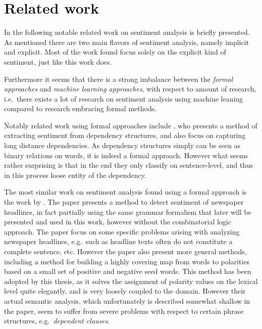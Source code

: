 \section{Related work}
\label{sec:relatedWork}
In the following notable related work on sentiment analysis is briefly presented. As mentioned there are two main flavors of sentiment analysis, namely implicit and explicit. Most of the work found focus solely on the explicit kind of sentiment, just like this work does. 

Furthermore it seems that there is a strong imbalance between the \emph{formal approaches} and \emph{machine learning approaches}, with respect to amount of research, i.e.\ there exists a lot of research on sentiment analysis using machine leaning compared to research embracing formal methods. 


Notably related work using formal approaches include \citeauthor{dependencySentiment} , who presents a method of extracting sentiment from dependency structures, and also focus on capturing long distance dependencies. As dependency structures simply can be seen as binary relations on words, it is indeed a formal approach. However what seems rather surprising is that in the end they only classify on sentence-level, and thus in this process loose entity of the dependency.

The most similar work on sentiment analysis found using a formal approach is the work by \citeauthor{valenceShifting} . The paper presents a method to detect sentiment of newspaper headlines, in fact partially using the same grammar formalism that later will be presented and used in this work, however without the combinatorial logic approach. The paper focus on some specific problems arising with analyzing newspaper headlines, e.g.\ such as headline texts often do not constitute a complete sentence, etc. However the paper also present more general methods, including a method for building a highly covering map from words to polarities based on a small set of positive and negative seed words. This method has been adopted by this thesis, as it solves the assignment of polarity values on the lexical level quite elegantly, and is very loosely coupled to the domain. However their actual semantic analysis, which unfortunately is described somewhat shallow in the paper, seem to suffer from severe problems with respect to certain phrase structures, e.g.\ \emph{dependent clauses}.



